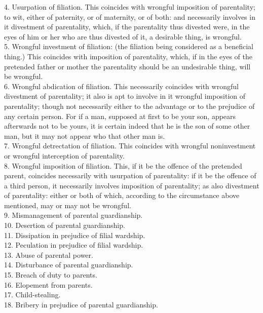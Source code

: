 \documentclass[12pt]{report}
\begin{document}
4. Usurpation of filiation. This coincides with wrongful imposition of
parentality; to wit, either of paternity, or of maternity, or of both:
and necessarily involves in it divestment of parentality, which, if the
parentality thus divested were, in the eyes of him or her who are thus
divested of it, a desirable thing, is wrongful.\\
5. Wrongful investment of filiation: (the filiation being considered as
a beneficial thing.) This coincides with imposition of parentality,
which, if in the eyes of the pretended father or mother the parentality
should be an undesirable thing, will be wrongful.\\
6. Wrongful abdication of filiation. This necessarily coincides with
wrongful divestment of parentality; it also is apt to involve in it
wrongful imposition of parentality; though not necessarily either to the
advantage or to the prejudice of any certain person. For if a man,
supposed at first to be your son, appears afterwards not to be yours, it
is certain indeed that he is the son of some other man, but it may not
appear who that other man is.\\
7. Wrongful detrectation of filiation. This coincides with wrongful
noninvestment or wrongful interception of parentality.\\
8. Wrongful imposition of filiation. This, if it be the offence of the
pretended parent, coincides necessarily with usurpation of parentality:
if it be the offence of a third person, it necessarily involves
imposition of parentality; as also divestment of parentality: either or
both of which, according to the circumstance above mentioned, may or may
not be wrongful.\\
9. Mismanagement of parental guardianship.\\
10. Desertion of parental guardianship.\\
11. Dissipation in prejudice of filial wardship.\\
12. Peculation in prejudice of filial wardship.\\
13. Abuse of parental power.\\
14. Disturbance of parental guardianship.\\
15. Breach of duty to parents.\\
16. Elopement from parents.\\
17. Child-stealing.\\
18. Bribery in prejudice of parental guardianship.
\end{document}
